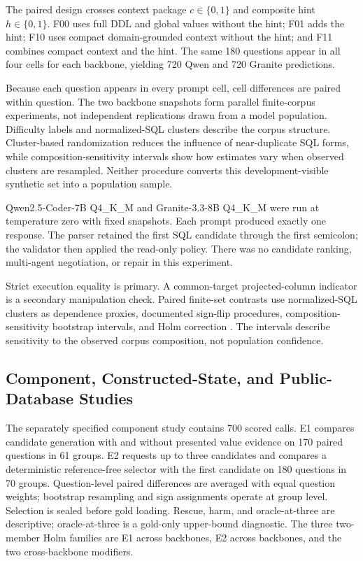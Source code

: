 \documentclass[information,article,submit,moreauthors]{Definitions/mdpi}
\begin{document}
The paired design crosses context package $c\in\{0,1\}$ and composite hint $h\in\{0,1\}$. F00 uses full DDL and global values without the hint; F01 adds the hint; F10 uses compact domain-grounded context without the hint; and F11 combines compact context and the hint. The same 180 questions appear in all four cells for each backbone, yielding 720 Qwen and 720 Granite predictions.

Because each question appears in every prompt cell, cell differences are paired within question. The two backbone snapshots form parallel finite-corpus experiments, not independent replications drawn from a model population. Difficulty labels and normalized-SQL clusters describe the corpus structure. Cluster-based randomization reduces the influence of near-duplicate SQL forms, while composition-sensitivity intervals show how estimates vary when observed clusters are resampled. Neither procedure converts this development-visible synthetic set into a population sample.

Qwen2.5-Coder-7B Q4\_K\_M and Granite-3.3-8B Q4\_K\_M were run at temperature zero with fixed snapshots. Each prompt produced exactly one response. The parser retained the first SQL candidate through the first semicolon; the validator then applied the read-only policy. There was no candidate ranking, multi-agent negotiation, or repair in this experiment.

Strict execution equality is primary. A common-target projected-column indicator is a secondary manipulation check. Paired finite-set contrasts use normalized-SQL clusters as dependence proxies, documented sign-flip procedures, composition-sensitivity bootstrap intervals, and Holm correction \cite{cameron2008bootstrap,canay2017randomization,holm1979simple}. The intervals describe sensitivity to the observed corpus composition, not population confidence.

\subsection{Component, Constructed-State, and Public-Database Studies}

The separately specified component study contains 700 scored calls. E1 compares candidate generation with and without presented value evidence on 170 paired questions in 61 groups. E2 requests up to three candidates and compares a deterministic reference-free selector with the first candidate on 180 questions in 70 groups. Question-level paired differences are averaged with equal question weights; bootstrap resampling and sign assignments operate at group level. Selection is sealed before gold loading. Rescue, harm, and oracle-at-three are descriptive; oracle-at-three is a gold-only upper-bound diagnostic. The three two-member Holm families are E1 across backbones, E2 across backbones, and the two cross-backbone modifiers.
\end{document}
